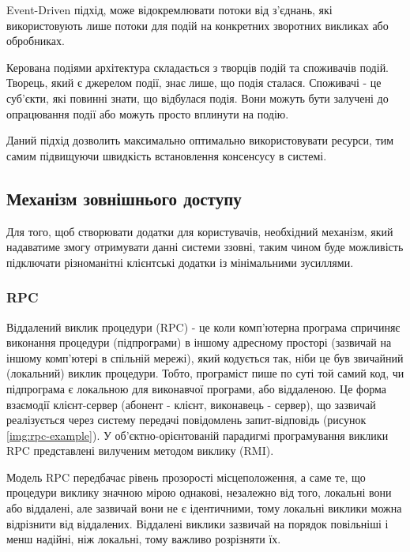 \documentclass{lib/styles/default-style}
\begin{document}
    Event-Driven підхід, може відокремлювати потоки від з'єднань,
    які використовують лише потоки для подій на конкретних зворотних викликах або обробниках.

    Керована подіями архітектура складається з творців подій та споживачів подій.
    Творець, який є джерелом події, знає лише, що подія сталася.
    Споживачі - це суб'єкти, які повинні знати, що відбулася подія.
    Вони можуть бути залучені до опрацювання події або можуть просто вплинути на подію.

    Даний підхід дозволить максимально оптимально використовувати ресурси, тим самим підвищуючи швидкість встановлення консенсусу в системі.

\subsection{Механізм зовнішнього доступу}

    Для того, щоб створювати додатки для користувачів, необхідний механізм, який надаватиме змогу отримувати данні системи ззовні,
    таким чином буде можливість підключати різноманітні клієнтські додатки із мінімальними зусиллями.

    \subsubsection{RPC}

    Віддалений виклик процедури (RPC) - це коли комп'ютерна програма спричиняє виконання процедури (підпрограми) в
    іншому адресному просторі (зазвичай на іншому комп’ютері в спільній мережі),
    який кодується так, ніби це був звичайний (локальний) виклик процедури.
    Тобто, програміст пише по суті той самий код, чи підпрограма є локальною для виконавчої програми, або віддаленою.
    Це форма взаємодії клієнт-сервер (абонент - клієнт, виконавець - сервер), що зазвичай реалізується через систему передачі
    повідомлень запит-відповідь (рисунок \ref{img:rpc-example}). У об'єктно-орієнтованій парадигмі програмування виклики RPC
    представлені вилученим методом виклику (RMI).


    Модель RPC передбачає рівень прозорості місцеположення, а саме те,
    що процедури виклику значною мірою однакові, незалежно від того,
    локальні вони або віддалені, але зазвичай вони не є ідентичними,
    тому локальні виклики можна відрізнити від віддалених.
    Віддалені виклики зазвичай на порядок повільніші і менш надійні, ніж локальні, тому важливо розрізняти їх.
\end{document}
